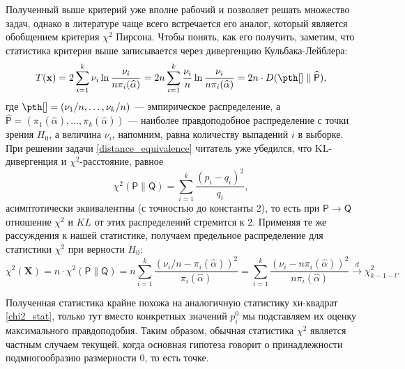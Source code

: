 Полученный выше критерий уже вполне рабочий и позволяет решать множество задач, однако в литературе чаще всего встречается его аналог, который является обобщением критерия $\chi^2$ Пирсона. Чтобы понять, как его получить, заметим, что статистика критерия выше записывается через дивергенцию Кульбака-Лейблера:
\[
T(\mathbf x) = 2 \sum_{i=1}^k \nu_i \ln{\frac{\nu_i}{n \pi_i(\widehat{\alpha})}} = 2n \sum_{i=1}^k \frac{\nu_i}{n} \ln{\frac{\nu_i}{n \pi_i(\widehat{\alpha})}} = 2n \cdot D(\pth[] \parallel \widehat{\mathsf{P}}),
\]
где $\pth[] = (\nu_1 / n, \ldots, \nu_k / n)$ --- эмпирическое распределение, а $\widehat{\mathsf{P}} = (\pi_1(\widehat{\alpha}), \ldots, \pi_k(\widehat{\alpha}))$ --- наиболее правдоподобное распределение с точки зрения $H_0$, а величина $\nu_i$, напомним, равна количеству выпадений $i$ в выборке. При решении задачи \ref{distance_equivalence} читатель уже убедился, что KL-дивергенция и $\chi^2$-расстояние, равное
\[
\chi^2(\mathsf{P} \parallel \mathsf{Q}) = \sum_{i=1}^k \frac{(p_i - q_i)^2}{q_i},
\]
асимптотически эквивалентны (с точностью до константы 2), то есть при $\mathsf{P} \to \mathsf{Q}$ отношение $\chi^2$ и $KL$ от этих распределений стремится к 2. Применяя те же рассуждения к нашей статистике, получаем предельное распределение для статистики $\chi^2$ при верности $H_0$:
\[
\chi^2(\mathbf X) = n \cdot \chi^2(\mathsf{P} \parallel \mathsf{Q}) = n \sum_{i=1}^k \frac{(\nu_i / n - \pi_i(\widehat{\alpha}))^2}{\pi_i(\widehat{\alpha})} = \sum_{i=1}^k \frac{(\nu_i - n\pi_i(\widehat{\alpha}))^2}{n\pi_i(\widehat{\alpha})} \stackrel{d}{\to} \chi^2_{k-1-l}.
\]

Полученная статистика крайне похожа на аналогичную статистику хи-квадрат \eqref{chi2_stat}, только тут вместо конкретных значений $p_i^0$ мы подставляем их оценку максимального правдоподобия. Таким образом, обычная статистика $\chi^2$ является частным случаем текущей, когда основная гипотеза говорит о принадлежности подмногообразию размерности 0, то есть точке.

